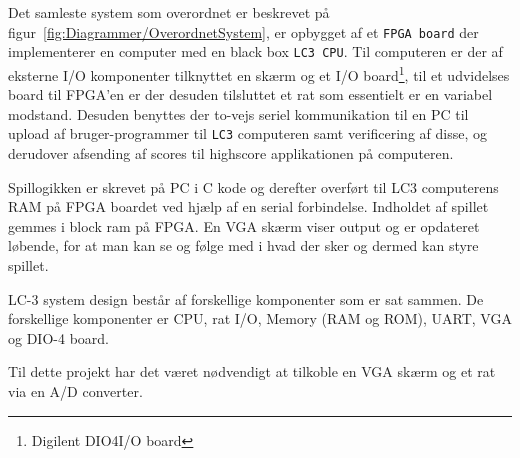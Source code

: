 Det samleste system som overordnet er beskrevet på figur~\vref{fig:Diagrammer/OverordnetSystem}, er opbygget af et \texttt{FPGA board} der implementerer en computer med en black box \texttt{LC3 CPU}. Til computeren er der af eksterne I/O komponenter tilknyttet en skærm og et I/O board\footnote{Digilent DIO4\texttrademark I/O board}, til et udvidelses board til FPGA'en er der desuden tilsluttet et rat som essentielt er en variabel modstand. Desuden benyttes der to-vejs seriel kommunikation til en PC til upload af bruger-programmer til \texttt{LC3} computeren samt verificering af disse, og derudover afsending af scores til highscore applikationen på computeren.


Spillogikken er skrevet på PC i C kode og derefter overført til LC3 computerens RAM på FPGA boardet ved hjælp af en serial forbindelse. Indholdet af spillet gemmes i block ram på FPGA. En VGA skærm viser output og er opdateret løbende, for at man kan se og følge med i hvad der sker og dermed kan styre spillet.

LC-3 system design består af forskellige komponenter som er sat sammen. De forskellige komponenter er CPU, rat I/O, Memory (RAM og ROM), UART, VGA og DIO-4 board.

Til dette projekt har det været nødvendigt at tilkoble en VGA skærm og et rat via en A/D converter.